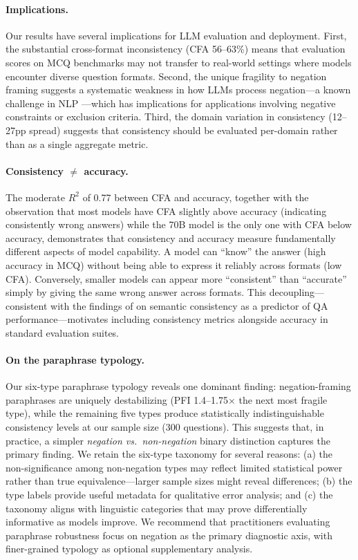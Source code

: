 \documentclass{article}
\begin{document}
\paragraph{Implications.}
Our results have several implications for LLM evaluation and deployment. First, the substantial cross-format inconsistency (CFA 56--63\%) means that evaluation scores on MCQ benchmarks may not transfer to real-world settings where models encounter diverse question formats. Second, the unique fragility to negation framing suggests a systematic weakness in how LLMs process negation---a known challenge in NLP \citep{elazar2021measuring}---which has implications for applications involving negative constraints or exclusion criteria. Third, the domain variation in consistency (12--27pp spread) suggests that consistency should be evaluated per-domain rather than as a single aggregate metric.

\paragraph{Consistency $\neq$ accuracy.}
The moderate $R^2$ of 0.77 between CFA and accuracy, together with the observation that most models have CFA slightly above accuracy (indicating consistently wrong answers) while the 70B model is the only one with CFA below accuracy, demonstrates that consistency and accuracy measure fundamentally different aspects of model capability. A model can ``know'' the answer (high accuracy in MCQ) without being able to express it reliably across formats (low CFA). Conversely, smaller models can appear more ``consistent'' than ``accurate'' simply by giving the same wrong answer across formats. This decoupling---consistent with the findings of \citet{rabinovich2023predicting} on semantic consistency as a predictor of QA performance---motivates including consistency metrics alongside accuracy in standard evaluation suites.

\paragraph{On the paraphrase typology.}
Our six-type paraphrase typology reveals one dominant finding: negation-framing paraphrases are uniquely destabilizing (PFI 1.4--1.75$\times$ the next most fragile type), while the remaining five types produce statistically indistinguishable consistency levels at our sample size (300 questions). This suggests that, in practice, a simpler \emph{negation vs.\ non-negation} binary distinction captures the primary finding. We retain the six-type taxonomy for several reasons: (a) the non-significance among non-negation types may reflect limited statistical power rather than true equivalence---larger sample sizes might reveal differences; (b) the type labels provide useful metadata for qualitative error analysis; and (c) the taxonomy aligns with linguistic categories that may prove differentially informative as models improve. We recommend that practitioners evaluating paraphrase robustness focus on negation as the primary diagnostic axis, with finer-grained typology as optional supplementary analysis.
\end{document}
